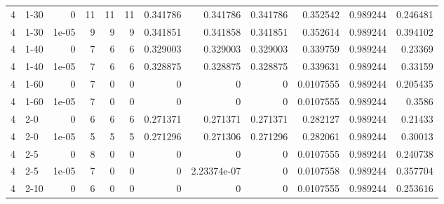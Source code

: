 \begin{tabular}{rlrrrrrrrrrr}
     4 & 1-30   &      0     &          11 &                11 &                11 &     0.341786    &     0.341786    &      0.341786    &        0.352542  &               0.989244 &           0.246481 \\
     4 & 1-30   &      1e-05 &           9 &                 9 &                 9 &     0.341851    &     0.341858    &      0.341851    &        0.352614  &               0.989244 &           0.394102 \\
     4 & 1-40   &      0     &           7 &                 6 &                 6 &     0.329003    &     0.329003    &      0.329003    &        0.339759  &               0.989244 &           0.23369  \\
     4 & 1-40   &      1e-05 &           7 &                 6 &                 6 &     0.328875    &     0.328875    &      0.328875    &        0.339631  &               0.989244 &           0.33159  \\
     4 & 1-60   &      0     &           7 &                 0 &                 0 &     0           &     0           &      0           &        0.0107555 &               0.989244 &           0.205435 \\
     4 & 1-60   &      1e-05 &           7 &                 0 &                 0 &     0           &     0           &      0           &        0.0107555 &               0.989244 &           0.3586   \\
     4 & 2-0    &      0     &           6 &                 6 &                 6 &     0.271371    &     0.271371    &      0.271371    &        0.282127  &               0.989244 &           0.21433  \\
     4 & 2-0    &      1e-05 &           5 &                 5 &                 5 &     0.271296    &     0.271306    &      0.271296    &        0.282061  &               0.989244 &           0.30013  \\
     4 & 2-5    &      0     &           8 &                 0 &                 0 &     0           &     0           &      0           &        0.0107555 &               0.989244 &           0.240738 \\
     4 & 2-5    &      1e-05 &           7 &                 0 &                 0 &     0           &     2.23374e-07 &      0           &        0.0107558 &               0.989244 &           0.357704 \\
     4 & 2-10   &      0     &           6 &                 0 &                 0 &     0           &     0           &      0           &        0.0107555 &               0.989244 &           0.253616 \\

\end{tabular}
